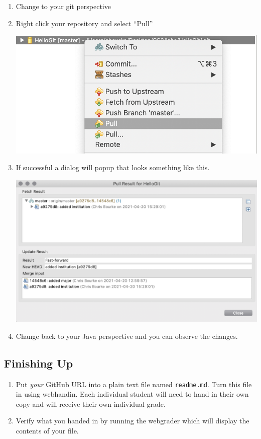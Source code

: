 \documentclass[12pt]{scrartcl}
\begin{document}
\begin{enumerate}
  \item Change to your git perspective
  \item Right click your repository and select ``Pull''
  	\begin{center}
	\includegraphics[scale=0.35]{./hack1.0-files/eclipseGitPull}
	\end{center}
  \item If successful a dialog will popup that looks something like this.
  	\begin{center}
	\includegraphics[scale=0.35]{./hack1.0-files/eclipseGitPullResult}
	\end{center}
  \item Change back to your Java perspective and you can observe the
  changes.

\end{enumerate}

\subsection{Finishing Up}

\begin{enumerate}
  \item Put \emph{your} GitHub URL into a plain text file named 
  \texttt{readme.md}.  Turn this file
  in using webhandin.  Each individual student will need
  to hand in their own copy and will receive their own individual
  grade.
  \item Verify what you handed in by running the webgrader which will
  display the contents of your file.
\end{enumerate}
\end{document}
